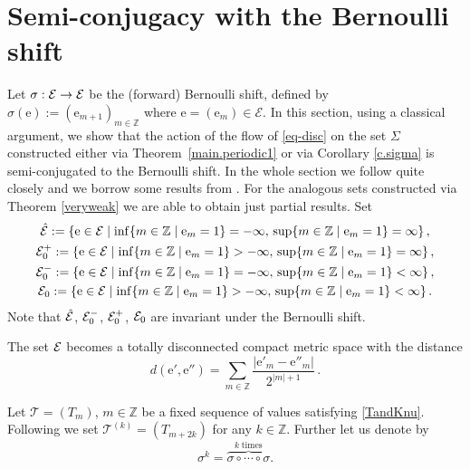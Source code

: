 \documentclass[10pt]{article}
\numberwithin{equation}{section}
\def\si{\sigma}
\def\Z{{\mathbb Z}}
\def\ee{{\mathrm e}}
\def\EE{{\mathcal E}}
\theoremstyle{definition}
\theoremstyle{remark}
\begin{document}
\section{Semi-conjugacy with the Bernoulli shift}\label{proof.Bernoulli}



Let $\si:{\cal E}\to{\cal E}$ be the (forward) Bernoulli shift, defined by
$\si(\ee):=(\ee_{m+1})_{m\in\Z}$ where $\ee=(\ee_m) \in \EE$.
In this section, using a classical argument, we show that the action of the flow of \eqref{eq-disc}
on the set $\Sigma$ constructed either via Theorem~\ref{main.periodic1} or via Corollary \ref{c.sigma} is semi-conjugated to the Bernoulli shift.
In the whole section we follow quite closely \cite[\S 6]{BF11} and we borrow some results from \cite[\S 6]{CFPrestate}.
For the analogous sets constructed via
Theorem \ref{veryweak} we are able to obtain just partial results.
Set
\begin{equation*}\label{defE}
\begin{gathered}
\hat{\cal E}:=\left\{\ee\in{\cal E} \mid \inf\{m\in\Z \mid \ee_m=1\}=-\infty,\, \sup\{m\in\Z \mid \ee_m=1\}=\infty\right\}, \\
{\cal E}_0^+:=\left\{\ee\in{\cal E} \mid \inf\{m\in\Z \mid \ee_m=1\}>-\infty,\, \sup\{m\in\Z \mid \ee_m=1\}=\infty\right\}, \\
{\cal E}_0^-:=\left\{\ee\in{\cal E} \mid \inf\{m\in\Z \mid \ee_m=1\}=-\infty,\, \sup\{m\in\Z \mid \ee_m=1\}<\infty\right\}, \\
{\cal E}_0:=\left\{\ee\in{\cal E} \mid \inf\{m\in\Z \mid
\ee_m=1\}>-\infty,\, \sup\{m\in\Z \mid \ee_m=1\}<\infty\right\}.
\end{gathered}
\end{equation*}
Note that $\hat{\cal E}$, ${\cal E}_0^-$, ${\cal E}_0^+$, ${\cal E}_0$ are
invariant under the Bernoulli shift.


The set ${\cal E}$ becomes a
totally disconnected compact metric space with the distance
\begin{equation}\label{metric}
d(\ee',\ee'') = \sum_{m\in\Z}\frac{|\ee'_{m}-\ee''_{m}|}{2^{|m|+1}}\, .
\end{equation}

Let $\mathcal{T}= (T_m )$, $m\in\Z$ be a fixed sequence of values satisfying \eqref{TandKnu}.
Following  \cite[\S 6]{BF11}
 we set
 $\mathcal{T}^{(k)}= ( T_{m+2k} )$  for any $k \in \Z$.
Further   let us denote by $$\sigma^k= \stackrel{k \;\text{times}}{\overbrace{\sigma \circ \cdots \circ \sigma}}.$$
\end{document}
